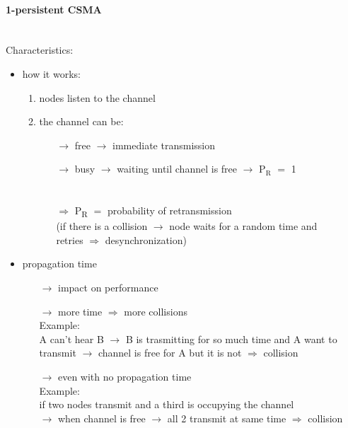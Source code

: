\paragraph{1-persistent CSMA}\mbox{}\\[0.2cm]
Characteristics:
\begin{itemize}
    \item how it works:
    \begin{enumerate}
        \item nodes listen to the channel
        \item the channel can be:
        \begin{itemize}
            \item[$\rightarrow$] free $\rightarrow$ immediate transmission
            \item[$\rightarrow$] busy $\rightarrow$ waiting until channel is free $\rightarrow$ $\text{P}_\text{R}$ $=$ 1\\\\\\
            $\Rightarrow$ P\textsubscript{R} $=$ probability of retransmission\\
            (if there is a collision $\rightarrow$ node waits for a random
            time and\\retries $\Rightarrow$ desynchronization)
        \end{itemize}
    \end{enumerate}
    \item propagation time
    \begin{itemize}
        \item[$\rightarrow$] impact on performance
        \item[$\rightarrow$] more time $\Rightarrow$ more collisions\\
        Example:\\
        A can't hear B $\rightarrow$ B is trasmitting for so much time and A want to transmit
        $\rightarrow$ channel is free for A but it is not $\Rightarrow$ collision
        \item[$\rightarrow$] even with no propagation time\\
        Example:\\if two nodes transmit and a third is occupying the channel\\
        $\rightarrow$ when channel is free $\rightarrow$ all 2 transmit at
        same time $\Rightarrow$ collision
    \end{itemize}
\end{itemize}

